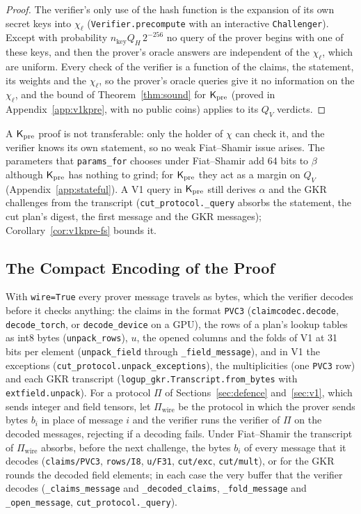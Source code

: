 \begin{proof}
The verifier's only use of the hash function is the expansion of its own secret keys into
$\chi_\ell$ (\texttt{Verifier.precompute} with an interactive \texttt{Challenger}). Except with
probability $n_{\mathrm{key}}Q_H\,2^{-256}$ no query of the prover begins with one of these keys, and
then the prover's oracle answers are independent of the $\chi_\ell$, which are uniform. Every check
of the verifier is a function of the claims, the statement, its weights and the $\chi_\ell$, so
the prover's oracle queries give it no information on the $\chi_\ell$, and the bound of
Theorem~\ref{thm:sound} for $\mathsf{K}_{\mathrm{pre}}$ (proved in Appendix~\ref{app:v1kpre}, with no public coins)
applies to its $Q_V$ verdicts.
\end{proof}

\noindent A $\mathsf{K}_{\mathrm{pre}}$ proof is not transferable: only the holder of $\chi$ can check it, and the
verifier knows its own statement, so no weak Fiat--Shamir issue arises. The parameters that
\texttt{params\_for} chooses under Fiat--Shamir add 64 bits to $\beta$ although $\mathsf{K}_{\mathrm{pre}}$ has nothing
to grind; for $\mathsf{K}_{\mathrm{pre}}$ they act as a margin on $Q_V$ (Appendix~\ref{app:stateful}). A V1 query in
$\mathsf{K}_{\mathrm{pre}}$ still derives $\alpha$ and the GKR challenges from the transcript
(\texttt{cut\_protocol.\_query} absorbs the statement, the cut plan's digest, the first message and
the GKR messages); Corollary~\ref{cor:v1kpre-fs} bounds it.

\subsection{The Compact Encoding of the Proof}
\label{app:codec}

 With \texttt{wire=True} every prover message travels as bytes, which the
verifier decodes before it checks anything: the claims in the format \texttt{PVC3}
(\texttt{claimcodec.decode}, \texttt{decode\_torch}, or \texttt{decode\_device} on a GPU), the rows
of a plan's lookup tables as int8 bytes (\texttt{unpack\_rows}), $u$, the opened columns and the
folds of V1 at 31 bits per element (\texttt{unpack\_field} through \texttt{\_field\_message}), and in
V1 the exceptions (\texttt{cut\_protocol.unpack\_exceptions}), the multiplicities (one \texttt{PVC3}
row) and each GKR transcript (\texttt{logup\_gkr.Transcript.from\_bytes} with
\texttt{extfield.unpack}). For a protocol $\Pi$ of Sections~\ref{sec:defence} and~\ref{sec:v1},
which sends integer and field tensors, let $\Pi_{\mathrm{wire}}$ be the protocol in which the prover
sends bytes $b_i$ in place of message $i$ and the verifier runs the verifier of $\Pi$ on the decoded
messages, rejecting if a decoding fails. Under Fiat--Shamir the transcript of
$\Pi_{\mathrm{wire}}$ absorbs, before the next challenge, the bytes $b_i$ of every message that it
decodes (\texttt{claims/PVC3}, \texttt{rows/I8}, \texttt{u/F31}, \texttt{cut/exc},
\texttt{cut/mult}), or for the GKR rounds the decoded field elements; in each case the very buffer
that the verifier decodes (\texttt{\_claims\_message} and \texttt{\_decoded\_claims},
\texttt{\_fold\_message} and \texttt{\_open\_message}, \texttt{cut\_protocol.\_query}).

